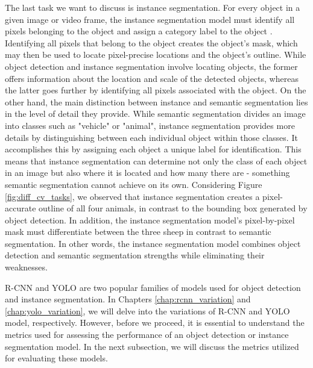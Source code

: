 The last task we want to discuss is instance segmentation. For every object in a given image or video frame, the instance segmentation model must identify all pixels belonging to the object and assign a category label to the object \cite{overview_cv_task}. Identifying all pixels that belong to the object creates the object's mask, which may then be used to locate pixel-precise locations and the object's outline. While object detection and instance segmentation involve locating objects, the former offers information about the location and scale of the detected objects, whereas the latter goes further by identifying all pixels associated with the object. On the other hand, the main distinction between instance and semantic segmentation lies in the level of detail they provide. While semantic segmentation divides an image into classes such as "vehicle" or "animal", instance segmentation provides more details by distinguishing between each individual object within those classes. It accomplishes this by assigning each object a unique label for identification. This means that instance segmentation can determine not only the class of each object in an image but also where it is located and how many there are - something semantic segmentation cannot achieve on its own. Considering Figure \ref{fig:diff_cv_tasks}, we observed that instance segmentation creates a pixel-accurate outline of all four animals, in contrast to the bounding box generated by object detection. In addition, the instance segmentation model's pixel-by-pixel mask must differentiate between the three sheep in contrast to semantic segmentation. In other words, the instance segmentation model combines object detection and semantic segmentation strengths while eliminating their weaknesses.
 
R-CNN and YOLO are two popular families of models used for object detection and instance segmentation. In Chapters \ref{chap:rcnn_variation} and \ref{chap:yolo_variation}, we will delve into the variations of R-CNN and YOLO model, respectively. However, before we proceed, it is essential to understand the metrics used for assessing the performance of an object detection or instance segmentation model. In the next subsection, we will discuss the metrics utilized for evaluating these models.